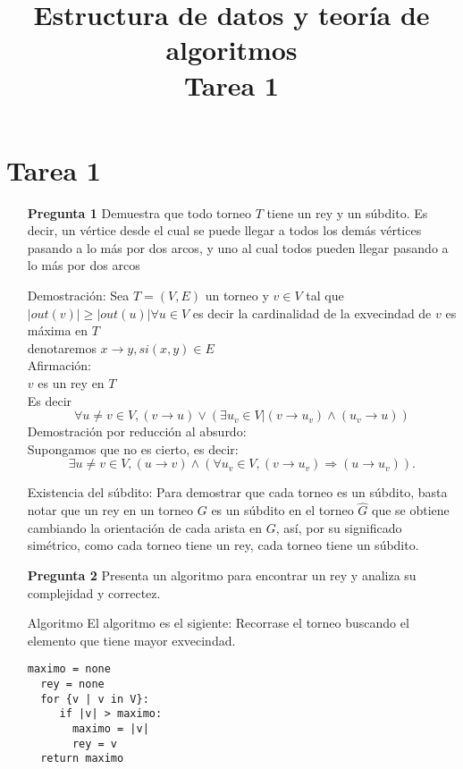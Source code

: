 \documentclass[12pt]{article}
\title{Estructura de datos y teoría de algoritmos\\
Tarea 1 }
\begin{document}
\lstset{language=python}
\maketitle

\section{Tarea 1}

\begin{itemize}
  \item[\bf{Pregunta 1}] Demuestra que todo torneo $T$ tiene un rey y un súbdito. Es decir, un vértice desde el cual se puede llegar a todos los demás vértices pasando a lo más por dos arcos, y uno al cual todos pueden llegar pasando a lo más por dos arcos

  \item[Demostración:]
    Sea $T=(V,E)$ un torneo y $ v \in V $ tal que $|out(v)| \ge |out(u)| \forall u\in V $ es decir la cardinalidad de la exvecindad de $v$ es máxima en $T$\\
    denotaremos $x \rightarrow  y, si (x,y)\in E$\\
    Afirmación:\\
    $v$ es un rey en $T$\\
    Es decir $$\forall u\ne v \in V ,  (v\rightarrow u) \vee (\exists u_v \in V  |  (v \rightarrow u_v) \wedge (u_v \rightarrow u))$$
    Demostración por reducción al absurdo:\\
    Supongamos que no es cierto, es decir:
    $$\exists u\ne v \in V ,  (u \rightarrow v) \wedge (\forall u_v \in V  ,  (v \rightarrow u_v)  \Rightarrow (u \rightarrow u_v)  ).$$

  \item[Existencia del súbdito:]
    Para demostrar que cada torneo es un súbdito, basta notar que un rey en un torneo $G$ es un súbdito en el torneo $\widehat G$ que se obtiene cambiando la orientación de cada arista en $G$, así, por su significado simétrico, como cada torneo tiene un rey, cada torneo tiene un súbdito.\\

\item[\bf{Pregunta 2}] Presenta un algoritmo para encontrar un rey y analiza su complejidad y correctez.

\item[Algoritmo]
  El algoritmo es el sigiente:
  Recorrase el torneo buscando el elemento que tiene mayor exvecindad.

\begin{lstlisting}[frame=single] 
  maximo = none
  rey = none
  for {v | v in V}:
     if |v| > maximo:
       maximo = |v|
       rey = v
  return maximo
\end{lstlisting}


\end{itemize}
\end{document}
